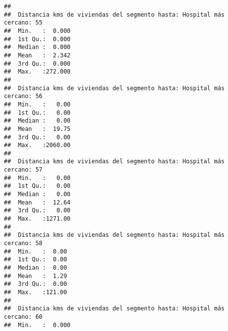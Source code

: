 \documentclass[11pt,]{article}
\begin{document}
\begin{verbatim}
##                                                                         
##  Distancia kms de viviendas del segmento hasta: Hospital más cercano: 55
##  Min.   :  0.000                                                        
##  1st Qu.:  0.000                                                        
##  Median :  0.000                                                        
##  Mean   :  2.342                                                        
##  3rd Qu.:  0.000                                                        
##  Max.   :272.000                                                        
##                                                                         
##  Distancia kms de viviendas del segmento hasta: Hospital más cercano: 56
##  Min.   :   0.00                                                        
##  1st Qu.:   0.00                                                        
##  Median :   0.00                                                        
##  Mean   :  19.75                                                        
##  3rd Qu.:   0.00                                                        
##  Max.   :2060.00                                                        
##                                                                         
##  Distancia kms de viviendas del segmento hasta: Hospital más cercano: 57
##  Min.   :   0.00                                                        
##  1st Qu.:   0.00                                                        
##  Median :   0.00                                                        
##  Mean   :  12.64                                                        
##  3rd Qu.:   0.00                                                        
##  Max.   :1271.00                                                        
##                                                                         
##  Distancia kms de viviendas del segmento hasta: Hospital más cercano: 58
##  Min.   :  0.00                                                         
##  1st Qu.:  0.00                                                         
##  Median :  0.00                                                         
##  Mean   :  1.29                                                         
##  3rd Qu.:  0.00                                                         
##  Max.   :121.00                                                         
##                                                                         
##  Distancia kms de viviendas del segmento hasta: Hospital más cercano: 60
##  Min.   :  0.000                                                        

\end{verbatim}
\end{document}
